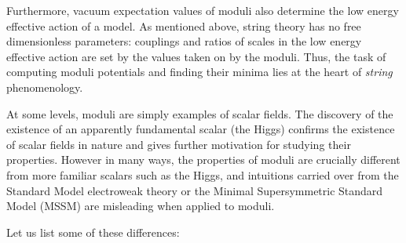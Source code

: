  Furthermore,  vacuum expectation values of moduli also determine the low energy effective action of a model. As mentioned above, string theory  has no free dimensionless parameters: couplings and ratios of scales in the low energy effective action are set by the 
 values taken on by the moduli. Thus, the task of computing moduli potentials and finding their minima lies at the heart of \emph{string} phenomenology.

 At some levels, moduli are simply examples of scalar fields. The discovery of the existence of an
apparently fundamental scalar (the Higgs) confirms the existence of scalar fields in nature and gives
further motivation for studying their properties. However in many ways, the properties of moduli are crucially different from more familiar scalars such
as the Higgs, and intuitions carried over from the Standard Model electroweak theory or the 
Minimal Supersymmetric Standard Model (MSSM) are misleading when applied to moduli.

Let us list some of these differences:

